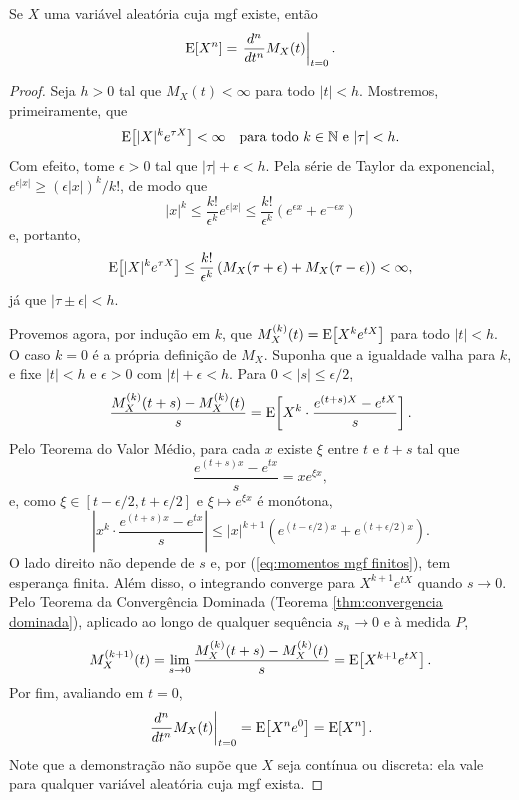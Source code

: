 \begin{thm:derivada do momento}
\label{thm:derivada do momento}
Se $X$ uma variável aleatória cuja mgf existe, então
\[
    \mathrm{E}\!\left[X^n\right] = \left. \frac{d^n}{dt^n} M_X(t)\right|_{t=0}.
\]
\end{thm:derivada do momento}
\begin{proof}
Seja $h > 0$ tal que $M_X(t) < \infty$ para todo $|t| < h$.
Mostremos, primeiramente, que
\begin{equation}
\label{eq:momentos mgf finitos}
    \mathrm{E}\!\left[|X|^k e^{\tau X}\right] < \infty \quad \text{para todo } k \in \mathbb{N} \text{ e } |\tau| < h.
\end{equation}
Com efeito, tome $\epsilon > 0$ tal que $|\tau| + \epsilon < h$.
Pela série de Taylor da exponencial, $e^{\epsilon |x|} \ge (\epsilon |x|)^k / k!$, de modo que
\[
    |x|^k \le \frac{k!}{\epsilon^k} e^{\epsilon |x|} \le \frac{k!}{\epsilon^k} \left(e^{\epsilon x} + e^{-\epsilon x}\right)
\]
e, portanto,
\[
    \mathrm{E}\!\left[|X|^k e^{\tau X}\right] \le \frac{k!}{\epsilon^k} \left(M_X(\tau + \epsilon) + M_X(\tau - \epsilon)\right) < \infty,
\]
já que $|\tau \pm \epsilon| < h$.

Provemos agora, por indução em $k$, que $M_X^{(k)}(t) = \mathrm{E}\!\left[X^k e^{tX}\right]$ para todo $|t| < h$.
O caso $k = 0$ é a própria definição de $M_X$.
Suponha que a igualdade valha para $k$, e fixe $|t| < h$ e $\epsilon > 0$ com
$|t| + \epsilon < h$.
Para $0 < |s| \le \epsilon/2$,
\[
    \frac{M_X^{(k)}(t+s) - M_X^{(k)}(t)}{s} = \mathrm{E}\!\left[X^k \cdot \frac{e^{(t+s)X} - e^{tX}}{s}\right].
\]
Pelo Teorema do Valor Médio, para cada $x$ existe $\xi$ entre $t$ e $t+s$ tal que
\[
    \frac{e^{(t+s)x} - e^{tx}}{s} = x e^{\xi x},
\]
e, como $\xi \in [t - \epsilon/2, t + \epsilon/2]$ e $\xi \mapsto e^{\xi x}$ é monótona,
\[
    \left| x^k \cdot \frac{e^{(t+s)x} - e^{tx}}{s} \right| \le
    |x|^{k+1} \left(e^{(t - \epsilon/2) x} + e^{(t + \epsilon/2) x}\right).
\]
O lado direito não depende de $s$ e, por (\ref{eq:momentos mgf finitos}), tem esperança
finita.
Além disso, o integrando converge para $X^{k+1} e^{tX}$ quando $s \to 0$.
Pelo Teorema da Convergência Dominada (Teorema \ref{thm:convergencia dominada}),
aplicado ao longo de qualquer sequência $s_n \to 0$ e
à medida $P$,
\[
    M_X^{(k+1)}(t) = \lim_{s \to 0} \frac{M_X^{(k)}(t+s) - M_X^{(k)}(t)}{s} = \mathrm{E}\!\left[X^{k+1} e^{tX}\right].
\]
Por fim, avaliando em $t = 0$,
\[
    \left. \frac{d^n}{dt^n} M_X(t)\right|_{t=0} = \mathrm{E}\!\left[X^n e^{0}\right] = \mathrm{E}\!\left[X^n\right].
\]
Note que a demonstração não supõe que $X$ seja contínua ou discreta: ela vale para qualquer
variável aleatória cuja mgf exista.
\end{proof}

